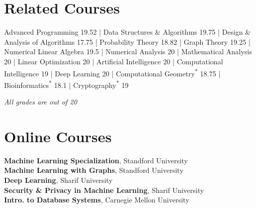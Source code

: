 	
\section{Related Courses}
Advanced Programming 19.52 | 
Data Structures \& Algorithms 19.75 | 
Design \& Analysis of Algorithms 17.75 | Probability Theory 18.82 |
Graph Theory 19.25 |
Numerical Linear Algebra 19.5 | 
Numerical Analysis 20 | 
Mathematical Analysis 20 |
Linear Optimization 20 |
Artificial Intelligence 20 | 
Computational Intelligence 19 |
Deep Learning 20 | 
Computational Geometry\textsuperscript{*} 18.75 |
Bioinformatics\textsuperscript{*}  18.1 | Cryptography\textsuperscript{*} 19 \\
\centerline{\textit{All grades are out of 20}}
\section{Online Courses}
\textbf{Machine Learning Specialization}, Standford University \\
\textbf{Machine Learning with Graphs}, Standford University \\
\textbf{Deep Learning}, Sharif University \\
\textbf{Security \& Privacy in Machine Learning}, Sharif University \\
\textbf{Intro. to Database Systems}, Carnegie Mellon University 
